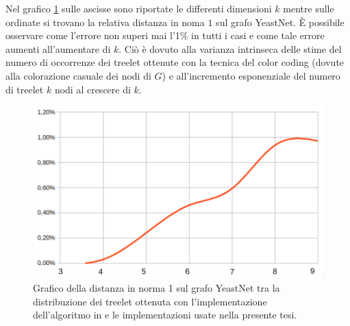 Nel grafico \ref{ERROR} sulle ascisse sono riportate le differenti dimensioni $ k $ mentre sulle ordinate si trovano la relativa distanza in noma $1$ sul grafo YeastNet.
È possibile osservare come l'errore non superi mai l'1\% in tutti i casi e come tale errore aumenti all'aumentare di $k$. 
Ciò è dovuto alla varianza intrinseca delle stime del numero di occorrenze dei treelet ottenute con la tecnica del color coding (dovute alla colorazione casuale dei nodi di $G$) e all'incremento esponenziale del numero di treelet $k$ nodi al crescere di $k$.
 

\begin{figure}[htbp]
	\includegraphics[width=15.4cm]{capitolo4/grafoErrorel1}
	\caption{Grafico della distanza in norma 1 sul grafo YeastNet tra la distribuzione dei treelet ottenuta con l'implementazione dell'algoritmo in \cite{TODO} e le implementazioni usate nella presente tesi.}
	\label{ERROR}
\end{figure}

